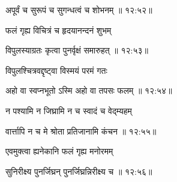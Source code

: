 
{\devanagarifont अपूर्वं च सुरूपं च सुगन्धत्वं च शोभनम् {॥ १२:५२॥} \veg\dontdisplaylinenum }%

{\devanagarifont फलं गृह्य विचित्रं च हृदयानन्दनं शुभम् \thinspace{\dandab} \dontdisplaylinenum }%
 

{\devanagarifont विपुलस्याग्रतः कृत्वा पुनर्वृक्षं समारुहत् {॥ १२:५३॥} \veg\dontdisplaylinenum }%

{\devanagarifont विपुलश्चित्रवद्दृष्ट्वा विस्मयं परमं गतः \thinspace{\dandab} \dontdisplaylinenum }%


{\devanagarifont अहो वा स्वप्नभूतो ऽस्मि अहो वा तपसः फलम् {॥ १२:५४॥} \veg\dontdisplaylinenum }%

{\devanagarifont न पश्यामि न जिघ्रामि न च स्वादं च वेद्म्यहम् \thinspace{\dandab} \dontdisplaylinenum }%


{\devanagarifont वार्त्तापि न च मे श्रोता प्रतिजानामि कंचन {॥ १२:५५॥} \veg\dontdisplaylinenum }%

{\devanagarifont एवमुक्त्वा ह्यनेकानि फलं गृह्य मनोरमम् \thinspace{\dandab} \dontdisplaylinenum }%


{\devanagarifont सुनिरीक्ष्य पुनर्जिघ्रन् पुनर्जिघ्रन्निरीक्ष्य च {॥ १२:५६॥} \veg\dontdisplaylinenum }%

